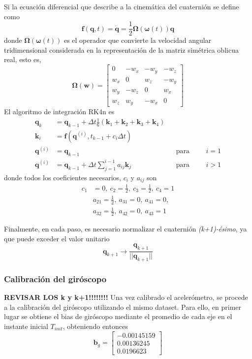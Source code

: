 Si la ecuación diferencial que describe a la cinemática del cuaternión se define como
\begin{equation}
    \bm{f}(\bm{q},t) = \dot{\bm{q}} = \frac{1}{2}\bm{\Omega}(\bm{\omega}(t))\bm{q}
\end{equation}
donde $\bm{\Omega}(\bm{\omega}(t))$ es el operador que convierte la velocidad angular tridimensional considerada en la representación de la matriz simétrica oblicua real, esto es,
\begin{equation}
    \bm{\Omega}(\bm{w}) = 
    \begin{bmatrix}
        0 & -w_x & -w_y & -w_z \\
        w_x & 0 & w_z & -w_y \\
        w_y & -w_z & 0 & w_x \\
        w_z & w_y & -w_x & 0
    \end{bmatrix}
\end{equation}
El algoritmo de integración RK4n es
\begin{align}
    \bm{q}_{k} &= \bm{q}_{k-1} + \Delta t\frac{1}{6}(\bm{k}_1 +\bm{k}_2 + \bm{k}_3 + \bm{k}_4) \\
    \bm{k}_i &= \bm{f}(\bm{q}^{(i)},t_{k-1}+c_i\Delta t) \\
    \bm{q}^{(i)} &= \bm{q}_{k-1} &&\text{para} &&&i=1 \\
    \bm{q}^{(i)} &= \bm{q}_{k-1} + \Delta t\sum_{j=1}^{i-1}a_{ij}\bm{k}_j &&\text{para} &&&i>1
\end{align}
donde todos los coeficientes necesarios, $c_i$ y $a_{ij}$ son
\begin{align*}
    c_1 &= 0,\ c_2 = \frac{1}{2},\ c_3 = \frac{1}{2},\ c_4 = 1 \\
    &a_{21} = \frac{1}{2},\ a_{31} = 0,\ a_{41} = 0, \\
    &a_{32} = \frac{1}{2},\ a_{42} = 0,\ a_{43} = 1
\end{align*}

Finalmente, en cada paso, es necesario normalizar el cuaternión \textit{(k+1)-ésimo}, ya que puede exceder el valor unitario
\begin{equation}
    \bm{q}_{k+1} \rightarrow \frac{\bm{q}_{k+1}}{||\bm{q}_{k+1}||}
\end{equation}

\subsubsection{Calibración del giróscopo}
\textbf{REVISAR LOS k y k+1!!!!!!!!}
Una vez calibrado el acelerómetro, se procede a la calibración del giróscopo utilizando el mismo dataset. Para ello, en primer lugar se obtiene el bias de giróscopo mediante el promedio de cada eje en el instante inicial $T_{init}$, obteniendo entonces
\begin{equation}
    \bm{b}_g =
    \begin{bmatrix}
         -0.00145159 \\
         0.00136245 \\
         0.0196623
    \end{bmatrix}
\end{equation}

